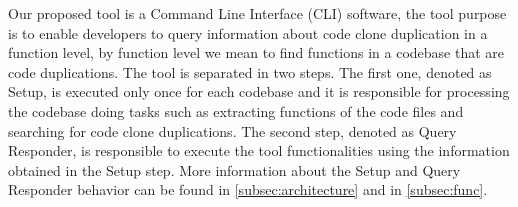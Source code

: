 \en

Our proposed tool is a Command Line Interface (CLI) software, the tool purpose is to enable developers to query 
information about code clone duplication in a function level, by function level we mean to find functions in a codebase that 
are code duplications. The tool is separated in two steps. The 
first one, denoted as Setup, is executed only once for each codebase and it is responsible for processing the
codebase doing tasks such as extracting functions of the code files 
and searching for code clone duplications. The second step, denoted as Query Responder, is
responsible to execute the tool functionalities using the information obtained in the Setup step. More information about the 
Setup and Query Responder behavior can be found in \ref{subsec:architecture} and in \ref{subsec:func}. 
